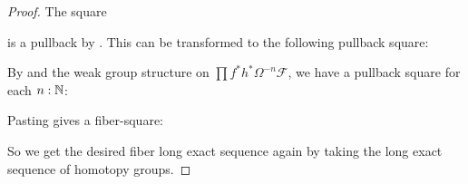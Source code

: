 \begin{proof}
  The square
  \begin{center}
  \end{center}
  is a pullback by \cite[Proposition 2.1.6]{egbert-thesis}.
  This can be transformed to the following pullback square:
  \begin{center}
  \end{center}
  
  By \cite[Lemma 3.3.6]{wellen-thesis} and the weak group structure on $\prod f^* h^* \Omega^{-n}\mathcal F$,
  we have a pullback square for each $n:\mathbb{N}$:
  \begin{center}
  \end{center}
  Pasting gives a fiber-square:
  \begin{center}
  \end{center}
  So we get the desired fiber long exact sequence again by taking the long exact sequence of homotopy groups.
\end{proof}
